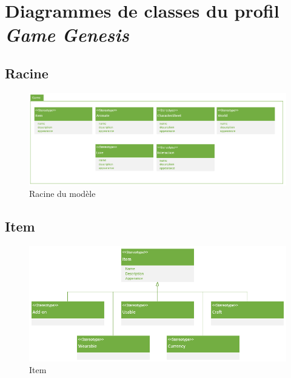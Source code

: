 \appendix
\chapter{Diagrammes de classes du profil \emph{Game Genesis}}

\section{Racine}
\begin{figure}[H]
    \begin{center}
    \includegraphics[width=14cm]{10_img/Z_annexeA/00.PNG}
    \caption{Racine du modèle}
    \label{A-racine}
    \end{center}
\end{figure}

\newpage
\section{Item}
\begin{figure}[H]
    \begin{center}
    \includegraphics[width=\linewidth]{10_img/Z_annexeA/item_racine.PNG}
    \caption{Item}
    \label{A-item-racine}
    \end{center}
\end{figure}

